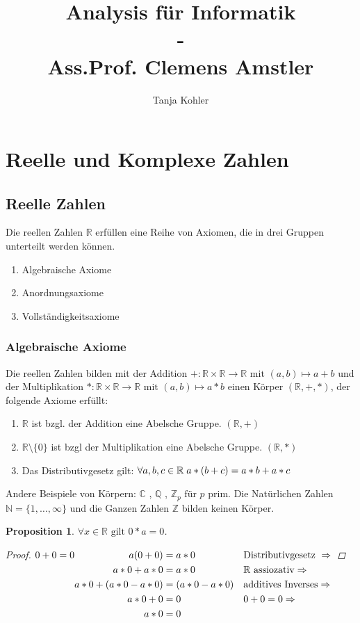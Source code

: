 \documentclass[a4paper,titlepage,oneside]{article}
\author{Tanja Kohler}
\title{Analysis für Informatik\small{ \\ - \\ Ass.Prof. Clemens Amstler}}
\def\C{\ensuremath{\mathbb{C}} }
\def\N{\ensuremath{\mathbb{N}} }
\def\Q{\ensuremath{\mathbb{Q}} }
\def\Z{\ensuremath{\mathbb{Z}} }
\def\R{\ensuremath{\mathbb{R}} }
\def\fa{\ensuremath{\forall}}
\def\sp{\hspace{0,1cm}}
\theoremstyle{thmstyle}
\newtheorem{prop}[satz]{Proposition}
\begin{document}
\maketitle

\onehalfspace
\section{Reelle und Komplexe Zahlen}
\subsection{Reelle Zahlen}
Die reellen Zahlen \R erfüllen eine Reihe von Axiomen, die in drei Gruppen unterteilt werden können.

\begin{enumerate}[label=\Roman*.]
	\item Algebraische Axiome
	\item Anordnungsaxiome
	\item Vollständigkeitsaxiome
\end{enumerate}

\subsubsection{Algebraische Axiome}
Die reellen Zahlen bilden mit der Addition \( + : \R \times \R \to \R \text{ mit } (a,b) \mapsto a + b\) und der Multiplikation \( * :  \R \times \R \to \R \text{ mit } (a,b) \mapsto a * b \)
einen Körper \((\R, +, * )\), der folgende Axiome erfüllt:
\begin{enumerate}[label=\arabic*)]
	\item \(\R\) ist bzgl. der Addition eine Abelsche Gruppe. \((\R,+)\)
	\item \(\R \setminus \{0\}\) ist bzgl der Multiplikation eine Abelsche Gruppe. \((\R,*)\)
	\item Das Distributivgesetz gilt: \( \fa a,b,c \in \R \sp a * (b + c) = a * b + a * c\)
\end{enumerate}
Andere Beispiele von Körpern: \C, \Q, \(\Z_p \text{ für }p\) prim.
Die Natürlichen Zahlen \(\N = \{1,\dots,\infty \} \) und die Ganzen Zahlen \Z bilden keinen Körper.

\begin{prop}
\(\fa x \in \R \text{ gilt } 0 * a = 0\).
\begin{proof}
\begin{math}
0+0 = 0 \begin{aligned}[t] a ( 0 + 0 ) &= a * 0 					&&\text{Distributivgesetz } \Rightarrow \\
					a * 0 + a * 0 &= a * 0 				&&\text{\R assiozativ} \Rightarrow\\
					a * 0 + (a * 0 - a * 0) &= (a * 0 - a * 0) 	&& \text{additives Inverses} \Rightarrow\\
					a * 0 +  0 &= 0	 					&& 0+0 = 0 \Rightarrow\\
					a * 0 &= 0 \end{aligned}\\
\end{math}
\end{proof}
\end{prop}
\end{document}
